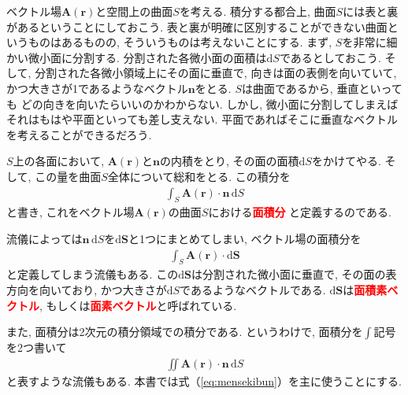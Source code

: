 ベクトル場$\bm{A}(\bm{r})$と空間上の曲面$S$を考える. 
積分する都合上, 曲面$S$には表と裏があるということにしておこう. 
表と裏が明確に区別することができない曲面というものはあるものの, そういうものは考えないことにする. 
まず, $S$を非常に細かい微小面に分割する. 分割された各微小面の面積は$\mathrm{d}S$であるとしておこう. 
そして, 分割された各微小領域上にその面に垂直で, 向きは面の表側を向いていて, 
かつ大きさが1であるようなベクトル$\bm{n}$をとる. $S$は曲面であるから, 垂直といっても
どの向きを向いたらいいのかわからない. しかし, 微小面に分割してしまえばそれはもはや平面といっても差し支えない. 
平面であればそこに垂直なベクトルを考えることができるだろう. 
\begin{center}
\end{center}
$S$上の各面において, $\bm{A}(\bm{r})$と$\bm{n}$の内積をとり, その面の面積$\mathrm{d}S$をかけてやる. 
そして, この量を曲面$S$全体について総和をとる. この積分を
\begin{eqnarray}
\int_{S} \bm{A}(\bm{r}) \cdot \bm{n} \, \mathrm{d}S
\label{eq:mensekibun}
\end{eqnarray}
と書き, これをベクトル場$\bm{A}(\bm{r})$の曲面$S$における\textbf{\textcolor{red}{面積分}}
と定義するのである. 

流儀によっては$\bm{n}\, \mathrm{d}S$を$\mathrm{d}\bm{S}$と1つにまとめてしまい, ベクトル場の面積分を
\begin{eqnarray}
\int_{S} \bm{A}(\bm{r}) \cdot \mathrm{d}\bm{S}
\label{eq:mensekibun2}
\end{eqnarray}
と定義してしまう流儀もある. この$\mathrm{d}\bm{S}$は分割された微小面に垂直で, その面の表方向を向いており, 
かつ大きさが$\mathrm{d}S$であるようなベクトルである. 
$\mathrm{d}\bm{S}$は\textbf{\textcolor{red}{面積素ベクトル}}, 
もしくは\textbf{\textcolor{red}{面素ベクトル}}と呼ばれている. 

また, 面積分は2次元の積分領域での積分である. というわけで, 面積分を$\int$記号を2つ書いて
\begin{eqnarray}
\iint \bm{A}(\bm{r}) \cdot \bm{n} \, \mathrm{d}S
\end{eqnarray}
と表すような流儀もある. 
本書では式（\ref{eq:mensekibun}）を主に使うことにする. 

